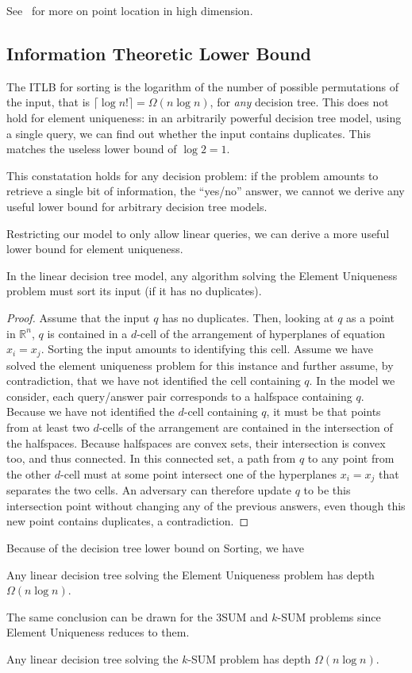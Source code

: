 See~\cite[Section~34.6]{Sn04} for more on point location in high dimension.

\subsection{Information Theoretic Lower Bound}%
\label{sec:problem:sum:itlb}

The ITLB for sorting is the logarithm of the number of possible
permutations of the input, that is \(\lceil \log n! \rceil = \Omega(n \log
n)\), for \emph{any} decision tree. This does not hold for element uniqueness:
in an arbitrarily powerful decision tree model, using a single query, we can
find out whether the input contains duplicates. This matches the useless lower
bound of \(\log 2 = 1\).

This constatation holds for any decision problem: if the problem amounts to
retrieve a single bit of information, the ``yes/no'' answer, we cannot we derive
any useful lower bound for arbitrary decision tree models.

Restricting our model to only allow linear queries,
we can derive a more useful lower bound for element uniqueness.
\begin{lemma}
	In the linear decision tree model,
	any algorithm solving the
	Element Uniqueness problem
	must
	sort its input (if it has no duplicates).
\end{lemma}
\begin{proof}
	Assume that the input \(q\) has no duplicates.
	Then, looking at \(q\) as a point in \(\mathbb{R}^n\), \(q\) is contained
	in a \(d\)-cell of the arrangement of hyperplanes of equation
	\(x_i = x_j\).
	Sorting the input amounts to identifying this cell.
	Assume we have solved the element uniqueness problem for this instance
	and further assume, by contradiction,
	that we have not identified the cell containing \(q\).
	In the model we consider, each query/answer pair corresponds to a halfspace
	containing \(q\).
	Because we have not identified the \(d\)-cell containing \(q\), it must be
	that points from at least two \(d\)-cells of the arrangement are contained
	in the intersection of the halfspaces.
	Because halfspaces are convex sets, their intersection is convex too, and
	thus connected. In this connected set, a path
	from \(q\) to any point from the other \(d\)-cell must at some point
	intersect one of the hyperplanes \(x_i = x_j\) that separates the two
	cells.
	An adversary can therefore update \(q\) to be this intersection point
	without changing any of the previous answers, even though this new point
	contains duplicates, a contradiction.
\end{proof}
%
Because of the decision tree lower bound on Sorting, we have
%
\begin{corollary}
	Any linear decision tree solving the
	Element Uniqueness problem
	has depth \(\Omega(n \log n)\).
\end{corollary}
%
The same conclusion can be drawn for the 3SUM and \(k\)-SUM problems since
Element Uniqueness reduces to them.
%
\begin{corollary}
	Any linear decision tree solving the
	\(k\)-SUM problem
	has depth \(\Omega(n \log n)\).
\end{corollary}


